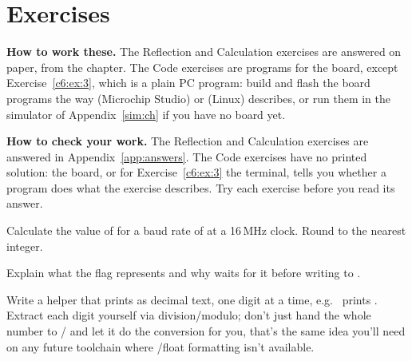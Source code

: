 
\section{Exercises}
\label{c6:sec:exercises}\label{c6:app:b}

\begin{aside}
\textbf{How to work these.} The Reflection and Calculation exercises are answered on paper, from
the chapter. The Code exercises are programs for the board, except Exercise~\ref{c6:ex:3}, which
is a plain PC program: build and flash the board programs the way  (Microchip
Studio) or  (Linux) describes, or run them in the simulator of
Appendix~\ref{sim:ch} if you have no board yet.

\textbf{How to check your work.} The Reflection and Calculation exercises are answered in
Appendix~\ref{app:answers}. The Code exercises have no printed solution: the board, or for
Exercise~\ref{c6:ex:3} the terminal, tells you whether a program does what the exercise describes.
Try each exercise before you read its answer.
\end{aside}

\label{c6:set:1}

\label{c6:ex:1}
Calculate the value of  for a baud rate of  at a 16\,MHz clock. Round to
the nearest integer.

\label{c6:ex:2}
Explain what the  flag represents and why  waits for it
before writing to .

\label{c6:set:2}

\label{c6:ex:3}
Write a  helper that prints  as decimal
text, one digit at a time, e.g.\  prints . Extract each
digit yourself via division/modulo; don't just hand the whole number to
/ and let it do the conversion for you, that's the same
idea you'll need on any future toolchain where /float formatting isn't available.

